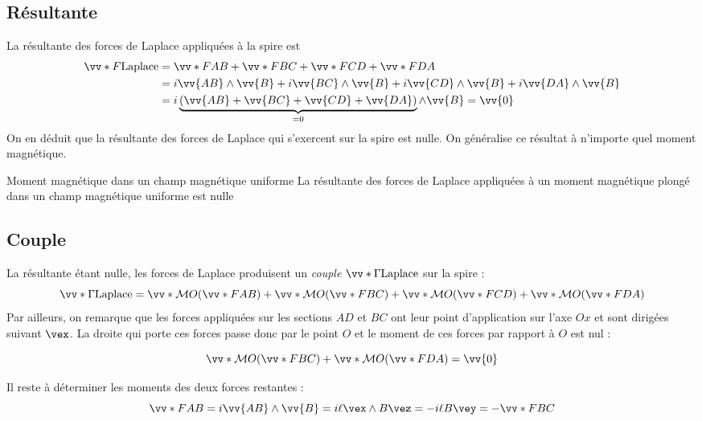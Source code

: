 \documentclass{cours}
\begin{document}
\subsection{Résultante}%
\label{sub:resultante}
La résultante des forces de Laplace appliquées à la spire est 
\begin{align}
  \vv*{F}{\text{Laplace}} &= \vv*{F}{AB} +  \vv*{F}{BC} + \vv*{F}{CD} + \vv*{F}{DA} \\
   &= i\vv{AB}\wedge \vv{B} + i\vv{BC}\wedge \vv{B} +i\vv{CD}\wedge \vv{B} +i\vv{DA}\wedge \vv{B}\\
   &=i\underbrace{(\vv{AB}+\vv{BC}+\vv{CD}+\vv{DA})}_{=0}\wedge \vv{B} = \vv{0}
\end{align}
On en déduit que la résultante des forces de Laplace qui s'exercent sur la spire est nulle. On généralise ce résultat à n'importe quel moment magnétique.
\begin{loi}{Moment magnétique dans un champ magnétique uniforme}
  La résultante des forces de Laplace appliquées à un moment magnétique plongé dans un champ magnétique uniforme est nulle
\end{loi}

\subsection{Couple}%
\label{sub:couple}
La résultante étant nulle, les forces de Laplace produisent un \emph{couple} $\vv*{\Gamma}{\text{Laplace}}$ sur la spire :
\begin{equation}
  \vv*{\Gamma}{\text{Laplace}} = \vv*{\mathcal{M}}{O}(\vv*{F}{AB}) + \vv*{\mathcal{M}}{O}(\vv*{F}{BC}) + \vv*{\mathcal{M}}{O}(\vv*{F}{CD}) + \vv*{\mathcal{M}}{O}(\vv*{F}{DA})   
\end{equation}
Par ailleurs, on remarque que les forces appliquées sur les sections $AD$ et $BC$ ont leur point d'application sur l'axe $Ox$ et sont dirigées suivant $\vex $. La droite qui porte ces forces passe donc par le point $O$ et le moment de ces forces par rapport à $O$ est nul :

\begin{equation}
  \vv*{\mathcal{M}}{O}(\vv*{F}{BC}) +\vv*{\mathcal{M}}{O}(\vv*{F}{DA}) = \vv{0}
\end{equation}

Il reste à déterminer les moments des deux forces restantes :
\begin{equation}
  \vv*{F}{AB}  = i\vv{AB}\wedge \vv{B} = i\ell \vex  \wedge B \vez  = -i\ell B \vey = -\vv*{F}{BC}
\end{equation}
\end{document}
